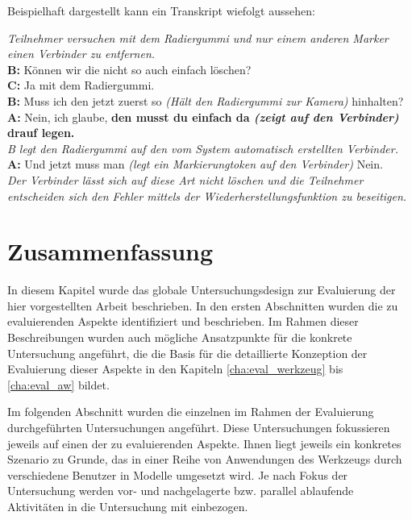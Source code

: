 Beispielhaft dargestellt kann ein Transkript wiefolgt aussehen:
\begin{transkript}
	\emph{Teilnehmer versuchen mit dem Radiergummi und nur einem anderen Marker einen Verbinder zu entfernen.}\\
	\textbf{B:} Können wir die nicht so auch einfach löschen?\\
	\textbf{C:} Ja mit dem Radiergummi.\\
	\textbf{B:} Muss ich den jetzt zuerst so \emph{(Hält den Radiergummi zur Kamera)} hinhalten?\\
	\textbf{A:} Nein, ich glaube, \textbf{den musst du einfach da \emph{(zeigt auf den Verbinder)} drauf legen.}\\
	\emph{B legt den Radiergummi auf den vom System automatisch erstellten Verbinder.}\\
	\textbf{A:} Und jetzt muss man \emph{(legt ein Markierungtoken auf den Verbinder)} Nein.\\
	\emph{Der Verbinder lässt sich auf diese Art nicht löschen und die Teilnehmer entscheiden sich den Fehler mittels der Wiederherstellungsfunktion zu beseitigen.}
\end{transkript}


\section{Zusammenfassung}
\label{sec:eval_ueberblick_zusammenfassung}

In diesem Kapitel wurde das globale Untersuchungsdesign zur Evaluierung der hier vorgestellten Arbeit beschrieben. In den ersten Abschnitten wurden die zu evaluierenden Aspekte identifiziert und beschrieben. Im Rahmen dieser Beschreibungen wurden auch mögliche Ansatzpunkte für die konkrete Untersuchung angeführt, die die Basis für die detaillierte Konzeption der Evaluierung dieser Aspekte in den Kapiteln \ref{cha:eval_werkzeug} bis \ref{cha:eval_aw} bildet. 

Im folgenden Abschnitt wurden die einzelnen im Rahmen der Evaluierung durchgeführten Untersuchungen angeführt. Diese Untersuchungen fokussieren jeweils auf einen der zu evaluierenden Aspekte. Ihnen liegt jeweils ein konkretes Szenario zu Grunde, das in einer Reihe von Anwendungen des Werkzeugs durch verschiedene Benutzer in Modelle umgesetzt wird. Je nach Fokus der Untersuchung werden vor- und nachgelagerte bzw. parallel ablaufende Aktivitäten in die Untersuchung mit einbezogen.

